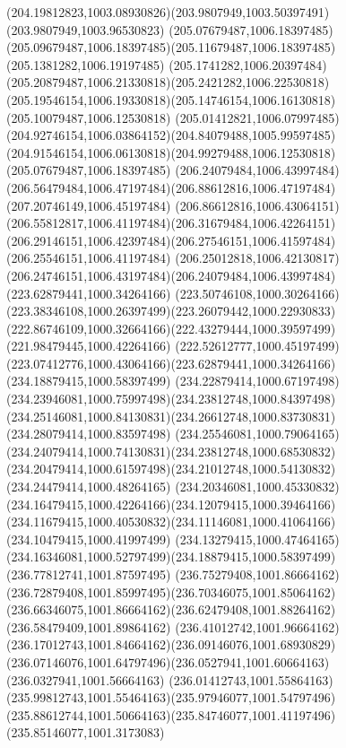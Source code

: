 {{		\curveto(204.19812823,1003.08930826)(203.9807949,1003.50397491)(203.9807949,1003.96530823)
		\moveto(205.07679487,1006.18397485)
		\curveto(205.09679487,1006.18397485)(205.11679487,1006.18397485)(205.1381282,1006.19197485)
		\curveto(205.1741282,1006.20397484)(205.20879487,1006.21330818)(205.2421282,1006.22530818)
		\curveto(205.19546154,1006.19330818)(205.14746154,1006.16130818)(205.10079487,1006.12530818)
		\curveto(205.01412821,1006.07997485)(204.92746154,1006.03864152)(204.84079488,1005.99597485)
		\curveto(204.91546154,1006.06130818)(204.99279488,1006.12530818)(205.07679487,1006.18397485)
		\moveto(206.24079484,1006.43997484)
		\curveto(206.56479484,1006.47197484)(206.88612816,1006.47197484)(207.20746149,1006.45197484)
		\curveto(206.86612816,1006.43064151)(206.55812817,1006.41197484)(206.31679484,1006.42264151)
		\curveto(206.29146151,1006.42397484)(206.27546151,1006.41597484)(206.25546151,1006.41197484)
		\curveto(206.25012818,1006.42130817)(206.24746151,1006.43197484)(206.24079484,1006.43997484)
		\moveto(223.62879441,1000.34264166)
		\curveto(223.50746108,1000.30264166)(223.38346108,1000.26397499)(223.26079442,1000.22930833)
		\curveto(222.86746109,1000.32664166)(222.43279444,1000.39597499)(221.98479445,1000.42264166)
		\curveto(222.52612777,1000.45197499)(223.07412776,1000.43064166)(223.62879441,1000.34264166)
		\moveto(234.18879415,1000.58397499)
		\curveto(234.22879414,1000.67197498)(234.23946081,1000.75997498)(234.23812748,1000.84397498)
		\curveto(234.25146081,1000.84130831)(234.26612748,1000.83730831)(234.28079414,1000.83597498)
		\curveto(234.25546081,1000.79064165)(234.24079414,1000.74130831)(234.23812748,1000.68530832)
		\curveto(234.20479414,1000.61597498)(234.21012748,1000.54130832)(234.24479414,1000.48264165)
		\curveto(234.20346081,1000.45330832)(234.16479415,1000.42264166)(234.12079415,1000.39464166)
		\curveto(234.11679415,1000.40530832)(234.11146081,1000.41064166)(234.10479415,1000.41997499)
		\curveto(234.13279415,1000.47464165)(234.16346081,1000.52797499)(234.18879415,1000.58397499)
		\moveto(236.77812741,1001.87597495)
		\curveto(236.75279408,1001.86664162)(236.72879408,1001.85997495)(236.70346075,1001.85064162)
		\curveto(236.66346075,1001.86664162)(236.62479408,1001.88264162)(236.58479409,1001.89864162)
		\curveto(236.41012742,1001.96664162)(236.17012743,1001.84664162)(236.09146076,1001.68930829)
		\curveto(236.07146076,1001.64797496)(236.0527941,1001.60664163)(236.0327941,1001.56664163)
		\curveto(236.01412743,1001.55864163)(235.99812743,1001.55464163)(235.97946077,1001.54797496)
		\curveto(235.88612744,1001.50664163)(235.84746077,1001.41197496)(235.85146077,1001.3173083)
}}
